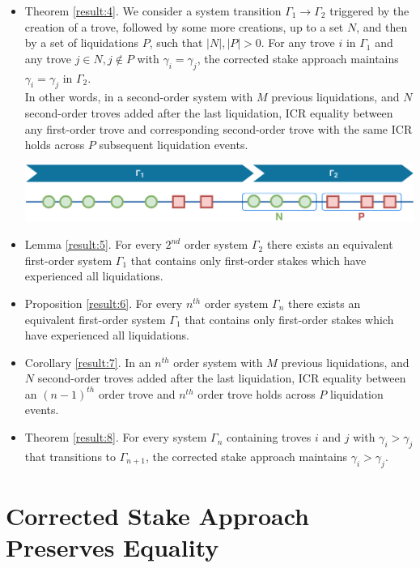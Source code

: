 \documentclass[reqno]{article}
\begin{document}
\begin{itemize}
  \item Theorem \ref{result:4}. We consider a system transition $\Gamma_1 \rightarrow \Gamma_2$ triggered by the creation of a trove, followed by some more creations, up to a set $N$, and then by a set of liquidations $P$, such that $|N|, |P| > 0$. For any trove $i$ in $\Gamma_1$ and any trove $j \in N, j\notin P$ with $\gamma_i = \gamma_j$, the corrected stake approach maintains $\gamma_i = \gamma_j$ in $\Gamma_2$. \\
    In other words, in a second-order system with $M$ previous liquidations, and $N$ second-order troves added after the last liquidation, ICR equality between any first-order trove and corresponding second-order trove with the same ICR holds across $P$ subsequent liquidation events.

    \includegraphics[width=\linewidth]{System_order_evolution_4.png}

  \item Lemma \ref{result:5}. For every $2^{nd}$ order system $\Gamma_2$ there exists an equivalent first-order system $\Gamma_1$ that contains only first-order stakes which have experienced all liquidations.

  \item Proposition \ref{result:6}. For every $n^{th}$ order system $\Gamma_n$ there exists an equivalent first-order system $\Gamma_1$ that contains only first-order stakes which have experienced all liquidations.

  \item Corollary \ref{result:7}. In an $n^{th}$ order system with $M$ previous liquidations, and $N$ second-order troves added after the last liquidation, ICR equality between an $(n-1)^{th}$ order trove and $n^{th}$ order trove holds across $P$ liquidation events.

  \item Theorem \ref{result:8}. For every system $\Gamma_n$ containing troves $i$ and $j$ with $\gamma_i > \gamma_j$ that transitions to $\Gamma_{n+1}$, the corrected stake approach maintains $\gamma_i > \gamma_j$.
\end{itemize}


\section{Corrected Stake Approach Preserves Equality}
\end{document}
